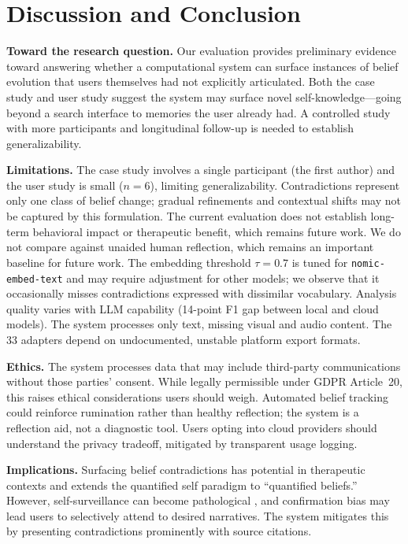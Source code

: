 \documentclass[pdflatex,sn-mathphys-num]{sn-jnl}
\begin{document}
\section{Discussion and Conclusion}\label{sec:discussion}

\textbf{Toward the research question.} Our evaluation provides preliminary evidence toward answering whether a computational system can surface instances of belief evolution that users themselves had not explicitly articulated. Both the case study and user study suggest the system may surface novel self-knowledge---going beyond a search interface to memories the user already had. A controlled study with more participants and longitudinal follow-up is needed to establish generalizability.

\textbf{Limitations.} The case study involves a single participant (the first author) and the user study is small ($n{=}6$), limiting generalizability. Contradictions represent only one class of belief change; gradual refinements and contextual shifts may not be captured by this formulation. The current evaluation does not establish long-term behavioral impact or therapeutic benefit, which remains future work. We do not compare against unaided human reflection, which remains an important baseline for future work. The embedding threshold $\tau{=}0.7$ is tuned for \texttt{nomic-embed-text} and may require adjustment for other models; we observe that it occasionally misses contradictions expressed with dissimilar vocabulary. Analysis quality varies with LLM capability (14-point F1 gap between local and cloud models). The system processes only text, missing visual and audio content. The 33 adapters depend on undocumented, unstable platform export formats.

\textbf{Ethics.} The system processes data that may include third-party communications without those parties' consent. While legally permissible under GDPR Article~20, this raises ethical considerations users should weigh. Automated belief tracking could reinforce rumination rather than healthy reflection; the system is a reflection aid, not a diagnostic tool. Users opting into cloud providers should understand the privacy tradeoff, mitigated by transparent usage logging.

\textbf{Implications.} Surfacing belief contradictions has potential in therapeutic contexts \cite{beck1979cognitive} and extends the quantified self paradigm \cite{wolf2010quantified} to ``quantified beliefs.'' However, self-surveillance can become pathological \cite{ruckenstein2014beyond}, and confirmation bias may lead users to selectively attend to desired narratives. The system mitigates this by presenting contradictions prominently with source citations.
\end{document}
